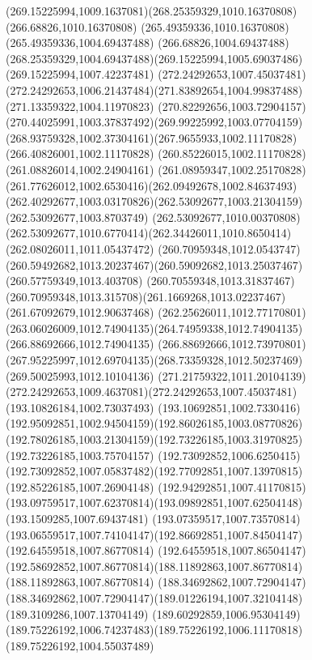 {{	\curveto(269.15225994,1009.1637081)(268.25359329,1010.16370808)(266.68826,1010.16370808)
	\lineto(265.49359336,1010.16370808)
	\lineto(265.49359336,1004.69437488)
	\lineto(266.68826,1004.69437488)
	\curveto(268.25359329,1004.69437488)(269.15225994,1005.69037486)(269.15225994,1007.42237481)
	\moveto(272.24292653,1007.45037481)
	\curveto(272.24292653,1006.21437484)(271.83892654,1004.99837488)(271.13359322,1004.11970823)
	\curveto(270.82292656,1003.72904157)(270.44025991,1003.37837492)(269.99225992,1003.07704159)
	\curveto(268.93759328,1002.37304161)(267.9655933,1002.11170828)(266.40826001,1002.11170828)
	\lineto(260.85226015,1002.11170828)
	\lineto(261.08826014,1002.24904161)
	\curveto(261.08959347,1002.25170828)(261.77626012,1002.6530416)(262.09492678,1002.84637493)
	\curveto(262.40292677,1003.03170826)(262.53092677,1003.21304159)(262.53092677,1003.8703749)
	\lineto(262.53092677,1010.00370808)
	\curveto(262.53092677,1010.6770414)(262.34426011,1010.8650414)(262.08026011,1011.05437472)
	\curveto(260.70959348,1012.0543747)(260.59492682,1013.20237467)(260.59092682,1013.25037467)
	\lineto(260.57759349,1013.403708)
	\lineto(260.70559348,1013.31837467)
	\curveto(260.70959348,1013.315708)(261.1669268,1013.02237467)(261.67092679,1012.90637468)
	\curveto(262.25626011,1012.77170801)(263.06026009,1012.74904135)(264.74959338,1012.74904135)
	\lineto(266.88692666,1012.74904135)
	\lineto(266.88692666,1012.73970801)
	\curveto(267.95225997,1012.69704135)(268.73359328,1012.50237469)(269.50025993,1012.10104136)
	\curveto(271.21759322,1011.20104139)(272.24292653,1009.4637081)(272.24292653,1007.45037481)
	\moveto(193.10826184,1002.73037493)
	\curveto(193.10692851,1002.7330416)(192.95092851,1002.94504159)(192.86026185,1003.08770826)
	\curveto(192.78026185,1003.21304159)(192.73226185,1003.31970825)(192.73226185,1003.75704157)
	\lineto(192.73092852,1006.6250415)
	\curveto(192.73092852,1007.05837482)(192.77092851,1007.13970815)(192.85226185,1007.26904148)
	\curveto(192.94292851,1007.41170815)(193.09759517,1007.62370814)(193.09892851,1007.62504148)
	\lineto(193.1509285,1007.69437481)
	\lineto(193.07359517,1007.73570814)
	\curveto(193.06559517,1007.74104147)(192.86692851,1007.84504147)(192.64559518,1007.86770814)
	\lineto(192.64559518,1007.86504147)
	\curveto(192.58692852,1007.86770814)(188.11892863,1007.86770814)(188.11892863,1007.86770814)
	\lineto(188.34692862,1007.72904147)
	\curveto(188.34692862,1007.72904147)(189.01226194,1007.32104148)(189.3109286,1007.13704149)
	\curveto(189.60292859,1006.95304149)(189.75226192,1006.74237483)(189.75226192,1006.11170818)
	\lineto(189.75226192,1004.55037489)
}}
